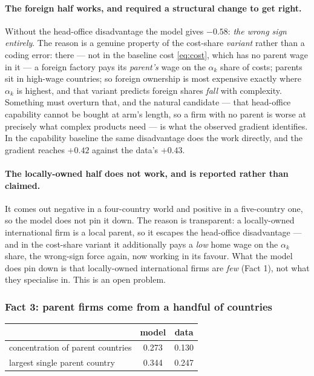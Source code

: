 \documentclass[11pt]{article}
\theoremstyle{plain}
\theoremstyle{remark}
\theoremstyle{definition}
\begin{document}
\paragraph{The foreign half works, and required a structural change to get right.}
Without the head-office disadvantage the model gives $-0.58$: \emph{the wrong sign
entirely}. The reason is a genuine property of the cost-share \emph{variant} rather
than a coding error: there --- not in the baseline cost \eqref{eq:cost}, which has no
parent wage in it --- a foreign factory pays its \emph{parent's} wage on the $\alpha_k$
share of costs; parents sit in high-wage countries; so foreign ownership is most
expensive exactly where $\alpha_k$ is highest, and that variant predicts foreign shares
\emph{fall} with complexity. Something must overturn that, and the natural candidate
--- that head-office capability cannot be bought at arm's length, so a firm with no
parent is worse at precisely what complex products need --- is what the observed
gradient identifies. In the capability baseline the same disadvantage does the work
directly, and the gradient reaches $+0.42$ against the data's $+0.43$.

\paragraph{The locally-owned half does not work, and is reported rather than claimed.}
It comes out negative in a four-country world and positive in a five-country one, so the
model does not pin it down. The reason is transparent: a locally-owned international
firm is a local parent, so it escapes the head-office disadvantage --- and in the
cost-share variant it additionally pays a \emph{low} home wage on the $\alpha_k$ share,
the wrong-sign force again, now working in its favour. What the model does pin down is
that locally-owned international firms are \emph{few} (Fact 1), not what they
specialise in. This is an open problem.

\subsubsection{Fact 3: parent firms come from a handful of countries}

\begin{center}
\begin{tabular}{lcc}
\toprule
 & model & data\\
\midrule
concentration of parent countries & 0.273 & 0.130\\
largest single parent country & 0.344 & 0.247\\
\bottomrule
\end{tabular}
\end{center}
\end{document}
